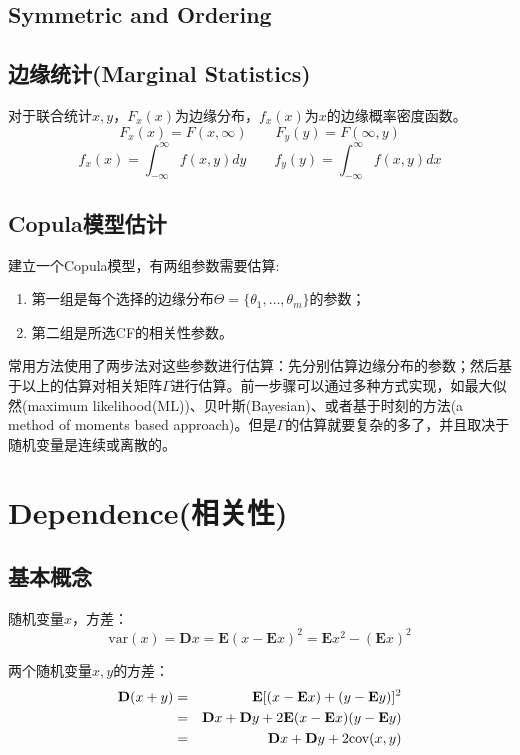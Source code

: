 \subsection{Symmetric and Ordering}





\subsection{边缘统计(Marginal Statistics)}
对于联合统计$x,y$，$F_x(x)$为边缘分布，$f_x(x)$为$x$的边缘概率密度函数。
\begin{equation}
    F_x(x) = F(x,\infty) \qquad F_y(y) = F(\infty,y)
    \label{eq0.1}
\end{equation}
\begin{equation}
    f_x(x) = \int_{-\infty}^{\infty} f(x,y) dy \qquad f_y(y) = \int_{-\infty}^{\infty} f(x,y) dx
    \label{eq0.2}
\end{equation}
\subsection{Copula模型估计}
建立一个Copula模型，有两组参数需要估算\cite{Smith2009}:
\begin{enumerate}
    \item 第一组是每个选择的边缘分布$\Theta = \{\theta_1,\dots,\theta_m\}$的参数；
    \item 第二组是所选CF的相关性参数。
\end{enumerate}
常用方法使用了两步法对这些参数进行估算：先分别估算边缘分布的参数；然后基于以上的估算对相关矩阵$\Gamma$进行估算。前一步骤可以通过多种方式实现，如最大似然(maximum likelihood(ML))、贝叶斯(Bayesian)、或者基于时刻的方法(a method of moments based approach)。但是$\Gamma$的估算就要复杂的多了，并且取决于随机变量是连续或离散的。

\section{Dependence(相关性)}
\subsection{基本概念}
随机变量$x$，方差：
\begin{equation}
    \text{var}(x) = \mathbf{D}x = \mathbf{E}(x-\mathbf{E}x)^2 = \mathbf{E}x^2-(\mathbf{E}x)^2
    \label{eq-var}
\end{equation}

两个随机变量$x,y$的方差：
\begin{eqnarray}
    \mathbf{D}(x+y) &=& \mathbf{E}[(x-\mathbf{E}x) + (y-\mathbf{E}y)]^2 \notag \\
    &=&\mathbf{D}x+\mathbf{D}y+2\mathbf{E}(x-\mathbf{E}x)(y-\mathbf{E}y) \notag \\
    &=&\mathbf{D}x+\mathbf{D}y+2\text{cov}(x,y)
    \label{eq-cov-var}
\end{eqnarray}

